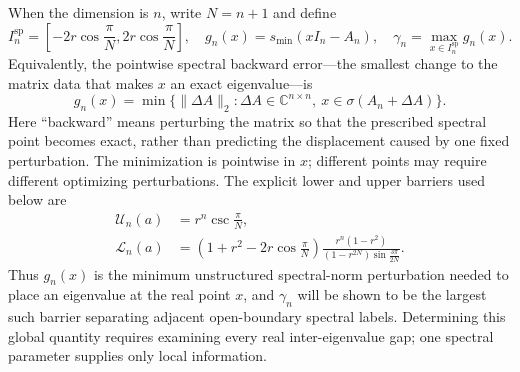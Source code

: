 \documentclass[12pt,anonymous]{iopjournal}
\numberwithin{equation}{section}
\theoremstyle{remark}
\newcommand{\C}{\mathbb C}
\begin{document}
When the dimension is \(n\), write \(N=n+1\) and define
\begin{equation}\label{eq:main-definitions}
 I_n^{\mathrm{sp}}=
 \left[-2r\cos\frac{\pi}{N},2r\cos\frac{\pi}{N}\right],
 \quad
 g_n(x)=s_{\min}(xI_n-A_n),
 \quad
 \gamma_n=\max_{x\in I_n^{\mathrm{sp}}}g_n(x).
\end{equation}
Equivalently, the pointwise spectral backward error---the smallest change
to the matrix data that makes \(x\) an exact eigenvalue---is
\begin{equation}\label{eq:backward-error-main}
 g_n(x)=
 \min\bigl\{\lVert\Delta A\rVert_2:
 \Delta A\in\C^{n\times n},\
 x\in\sigma(A_n+\Delta A)\bigr\}.
\end{equation}
Here ``backward'' means perturbing the matrix so that the prescribed
spectral point becomes exact, rather than predicting the displacement
caused by one fixed perturbation.
The minimization is pointwise in \(x\); different points may require
different optimizing perturbations.
The explicit lower and upper barriers used below are
\begin{align}
 \mathcal U_n(a)&=r^n\csc\frac{\pi}{N},\label{eq:main-U-def}\\
 \mathcal L_n(a)&=
 \left(1+r^2-2r\cos\frac{\pi}{N}\right)
 \frac{r^n(1-r^2)}
 {(1-r^{2N})\sin\frac{3\pi}{2N}}.\label{eq:main-L-def}
\end{align}
Thus \(g_n(x)\) is the minimum unstructured spectral-norm perturbation
needed to place an eigenvalue at the real point \(x\), and \(\gamma_n\) will
be shown to be the largest such barrier separating adjacent open-boundary
spectral labels.  Determining this global quantity requires examining every
real inter-eigenvalue gap; one spectral parameter supplies only local
information.
\end{document}
